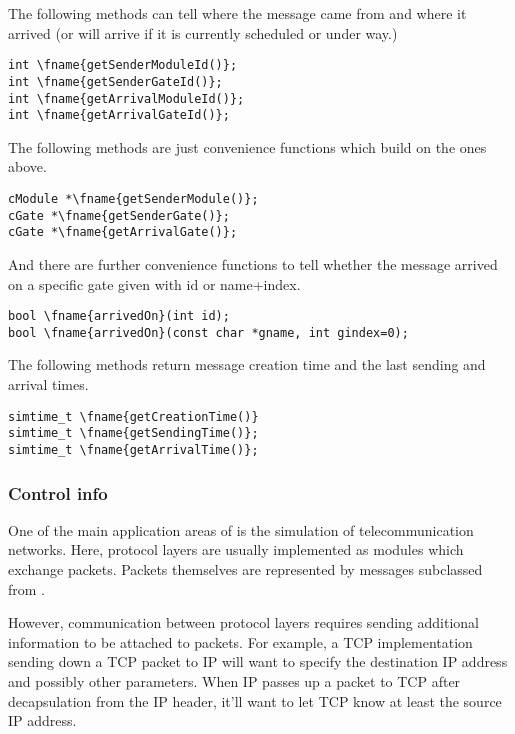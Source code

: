The following methods can tell where the message came from and
where it arrived (or will arrive if it is currently scheduled or under way.)

\begin{Verbatim}[commandchars=\\\{\}]
int \fname{getSenderModuleId()};
int \fname{getSenderGateId()};
int \fname{getArrivalModuleId()};
int \fname{getArrivalGateId()};
\end{Verbatim}

The following methods are just convenience functions which build
on the ones above.

\begin{Verbatim}[commandchars=\\\{\}]
cModule *\fname{getSenderModule()};
cGate *\fname{getSenderGate()};
cGate *\fname{getArrivalGate()};
\end{Verbatim}

And there are further convenience functions to tell whether
the message arrived on a specific gate given with id or
name+index.

\begin{Verbatim}[commandchars=\\\{\}]
bool \fname{arrivedOn}(int id);
bool \fname{arrivedOn}(const char *gname, int gindex=0);
\end{Verbatim}

The following methods return message creation time and the last sending
and arrival times.

\begin{Verbatim}[commandchars=\\\{\}]
simtime_t \fname{getCreationTime()}
simtime_t \fname{getSendingTime()};
simtime_t \fname{getArrivalTime()};
\end{Verbatim}

\subsubsection{Control info}

One of the main application areas of {\opp} is the simulation of
telecommunication networks. Here, protocol layers are usually
implemented as modules which exchange packets. Packets themselves
are represented by messages subclassed from .

However, communication between protocol layers requires sending
additional information to be attached to packets. For example,
a TCP implementation sending down a TCP packet to IP will want
to specify the destination IP address and possibly
other parameters. When IP passes up a packet to TCP after
decapsulation from the IP header, it'll want to let TCP know
at least the source IP address.

